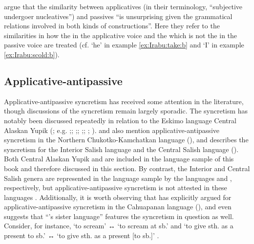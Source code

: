 \citet[244]{zuniga:kittila:2019} argue that the similarity between applicatives (in their terminology, “subjective undergoer nucleatives”) and passives “is unsurprising given the grammatical relations involved in both kinds of constructions”. Here they refer to the similarities in how the  in the applicative voice and the  which is not the  in the passive voice are treated (cf.  ‘he’ in example \ref{ex:Irabu:take:b} and  ‘I’ in example \ref{ex:Irabu:scold:b}).

\subsection{Applicative-antipassive} \label{sec:simple-syncretism:appl-antp}
Applicative-antipassive syncretism has received some attention in the literature, though discussions of the syncretism remain largely sporadic. The syncretism has notably been discussed repeatedly in relation to the Eskimo language Central Alaskan Yupik (; e.g. \citealt[121f.]{malchukov:2015};; \citeyear[405ff.]{malchukov:2016};; \citeyear[13ff.]{malchukov:2017};; \citealt[243]{zuniga:kittila:2019}; \citealt[210ff.]{basilico:2019}). \citeauthor{malchukov:2015} and \citeauthor{zuniga:kittila:2019} also mention applicative-antipassive syncretism in the Northern Chukotko-Kamchatkan language  (), and \citeauthor{malchukov:2015} describes the syncretism for the Interior Salish language  and the Central Salish language  (). Both Central Alaskan Yupik and  are included in the language sample of this book and therefore discussed in this section. By contrast, the Interior and Central Salish genera are represented in the language sample by the languages  and , respectively, but applicative-antipassive syncretism is not attested in these languages \citep{willett:2003, suttles:2004}. Additionally, it is worth observing that \citet[524ff.]{valenzuela:2016} has explicitly argued for applicative-antipassive syncretism in the Cahuapanan language  (), and even suggests that “’s sister language”  features the syncretism in question as well. Consider, for instance,   ‘to scream’ ↔  ‘to scream at sb.’ and  ‘to give sth. as a present to sb.’ ↔  ‘to give sth. as a present [to sb.]’ \citep[524f.]{valenzuela:2016}.

